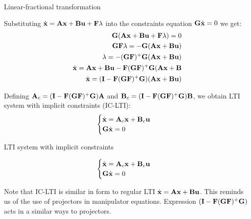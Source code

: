 \documentclass{beamer}
\begin{document}
\begin{frame}{Linear-fractional transformation}
	\begin{flushleft}
		
		Substituting $\dot{\mathbf{x}}=\mathbf{A}\mathbf{x}+\mathbf{B}\mathbf{u}+\mathbf{F}\lambda $ into the constraints equation $\mathbf{G}\dot{\mathbf{x}}=0$ we get:
		\begin{align}
			\mathbf{G}(\mathbf{A}\mathbf{x}+\mathbf{B}\mathbf{u}+\mathbf{F}\lambda )=0
			\\
			\mathbf{G}\mathbf{F}\lambda =-\mathbf{G}(\mathbf{A}\mathbf{x}+\mathbf{B}\mathbf{u})
			\\
			\lambda =-(\mathbf{G}\mathbf{F})^+\mathbf{G}(\mathbf{A}\mathbf{x}+\mathbf{B}\mathbf{u})
			\\
			\dot{\mathbf{x}}=\mathbf{A}\mathbf{x}+\mathbf{B}\mathbf{u}-\mathbf{F}(\mathbf{G}\mathbf{F})^+\mathbf{G}(\mathbf{A}\mathbf{x}+\mathbf{B}
			\\
			\dot{\mathbf{x}}=(\mathbf{I}-\mathbf{F}(\mathbf{G}\mathbf{F})^+\mathbf{G})(\mathbf{A}\mathbf{x}+\mathbf{B}\mathbf{u})
		\end{align}
		
		Defining $\mathbf{A}_c = (\mathbf{I}-\mathbf{F}(\mathbf{G}\mathbf{F})^+\mathbf{G})\mathbf{A}$ and $\mathbf{B}_c = (\mathbf{I}-\mathbf{F}(\mathbf{G}\mathbf{F})^+\mathbf{G})\mathbf{B}$, we obtain LTI system with implicit constraints (IC-LTI):
		\begin{equation}
			\begin{cases}
				\dot{\mathbf{x}}=\mathbf{A}_c\mathbf{x}+\mathbf{B}_c\mathbf{u}
				\\
				\mathbf{G}\dot{\mathbf{x}}=0
			\end{cases}
		\end{equation}
		
	\end{flushleft}
\end{frame}



\begin{frame}{LTI system with implicit constraints}
	\begin{flushleft}
		
		\textcolor{mygrey}{
		\begin{equation}
			\begin{cases}
				\dot{\mathbf{x}}=\mathbf{A}_c\mathbf{x}+\mathbf{B}_c\mathbf{u}
				\\
				\mathbf{G}\dot{\mathbf{x}}=0
			\end{cases}
		\end{equation}
		}

		Note that IC-LTI is similar in form to regular LTI $\dot{\mathbf{x}}=\mathbf{A}\mathbf{x}+\mathbf{B}\mathbf{u}$. This reminds us of the use of projectors in manipulator equations. Expression $(\mathbf{I}-\mathbf{F}(\mathbf{G}\mathbf{F})^+\mathbf{G})$ acts in a similar ways to projectors.

	\end{flushleft}
\end{frame}
\end{document}
